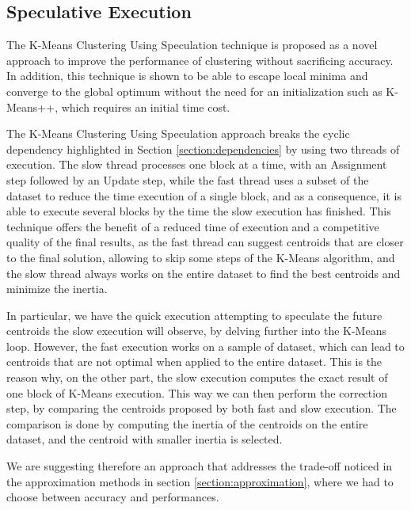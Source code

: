 \subsection{Speculative Execution}

The K-Means Clustering Using Speculation technique is proposed as a novel approach to improve the performance of clustering without sacrificing accuracy. In addition, this technique is shown to be able to escape local minima and converge to the global optimum without the need for an initialization such as K-Means++, which requires an initial time cost.

The K-Means Clustering Using Speculation approach breaks the cyclic dependency highlighted in Section \ref{section:dependencies} by using two threads of execution. The slow thread processes one block at a time, with an Assignment step followed by an Update step, while the fast thread uses a subset of the dataset to reduce the time execution of a single block, and as a consequence, it is able to execute several blocks by the time the slow execution has finished.
This technique offers the benefit of a reduced time of execution and a competitive quality of the final results, as the fast thread can suggest centroids that are closer to the final solution, allowing to skip some steps of the K-Means algorithm, and the slow thread always works on the entire dataset to find the best centroids and minimize the inertia.

In particular, we have the quick execution attempting to speculate the future centroids the slow execution will observe, by delving further into the K-Means loop. However, the fast execution works on a sample of dataset, which can lead to centroids that are not optimal when applied to the entire dataset. This is the reason why, on the other part, the slow execution computes the exact result of one block of K-Means execution. This way we can then perform the correction step, by comparing the centroids proposed by both fast and slow execution. The comparison is done by computing the inertia of the centroids on the entire dataset, and the centroid with smaller inertia is selected.

We are suggesting therefore an approach that addresses the trade-off noticed in the approximation methods in section \ref{section:approximation},  where we had to choose between accuracy and performances.

